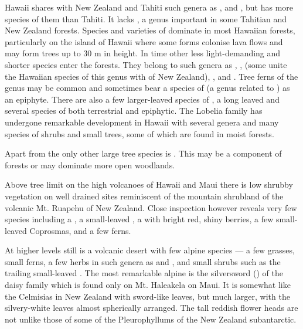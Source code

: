 Hawai{\okina}i shares with New Zealand and Tahiti such genera as ,  and , but has more species of them than Tahiti.
It lacks , a genus important in some Tahitian and New Zealand forests.
Species and varieties of  dominate in most Hawaiian forests, particularly on the island of Hawai{\okina}i where some forms colonise lava flows and may form trees up to 30 m in height.
In time other less light-demanding and shorter species enter the forests.
They belong to such genera as , ,  (some unite the Hawaiian species of this genus with  of New Zealand), ,  and .
Tree ferns of the genus  may be common and sometimes bear a species of  (a genus related to ) as an epiphyte.
There are also a few larger-leaved species of , a long leaved  and several species of  both terrestrial and epiphytic.
The Lobelia family has undergone remarkable development in Hawai{\okina}i with several genera and many species of shrubs and small trees, some of which are found in moist forests.

Apart from  the only other large tree species is .
This may be a component of  forests or may dominate more open woodlands.

Above tree limit on the high volcanoes of Hawai{\okina}i and Maui there is low shrubby vegetation on well drained sites reminiscent of the mountain shrubland of the volcanic Mt.
Ruapehu of New Zealand.
Close inspection however reveals very few species including a , a small-leaved , a  with bright red, shiny berries, a few small-leaved Coprosmas, and a few ferns.

At higher levels still is a volcanic desert with few alpine species — a few grasses, small ferns, a few herbs in such genera as  and , and small shrubs such as the trailing small-leaved .
The most remarkable alpine is the silversword () of the daisy family which is found only on Mt.
Haleakela on Maui.
It is somewhat like the Celmisias in New Zealand with sword-like leaves, but much larger, with the silvery-white leaves almost spherically arranged.
The tall reddish flower heads are not unlike those of some of the Pleurophyllums of the New Zealand subantarctic.

